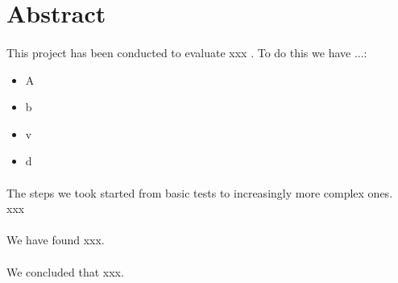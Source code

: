 \section*{Abstract}









\paragraph{}
This project has been conducted to evaluate xxx . To do this we have ...:
\begin{itemize}
    \item A
    \item b
    \item v
    \item d
\end{itemize}

\paragraph{}
The steps we took started from basic tests to increasingly more complex ones. xxx

\paragraph{}
We have found xxx.

\paragraph{}
We concluded that xxx.
